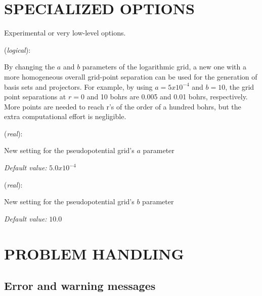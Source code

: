 \documentclass[11pt]{article}
\begin{document}
\section{SPECIALIZED OPTIONS}

Experimental or very low-level options.

\begin{description}
\itemsep 10pt
\parsep 0pt

\item[{\bf Reparametrize.Pseudos}] ({\it logical}): 

By changing the $a$ and $b$ parameters of the logarithmic grid, a new one
with a more homogeneous overall grid-point separation can be used for
the generation of basis sets and projectors. For example, by using
$a=5x10^{-4}$ and $b=10$, the grid point separations at $r=0$ and 10 bohrs are
0.005 and 0.01 bohrs, respectively. More points are needed to reach r's of
the order of a hundred bohrs, but the extra computational effort is negligible.

\item[{\bf New.A.Parameter}] ({\it real}):

New setting for the pseudopotential grid's $a$ parameter

{\it Default value:} { $5.0x10^{-4}$}

\item[{\bf New.B.Parameter}] ({\it real}):

New setting for the pseudopotential grid's $b$ parameter

{\it Default value:} { $10.0$}

\end{description}

\section{PROBLEM HANDLING}

\subsection{Error and warning messages}
\end{document}
